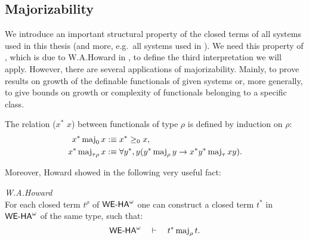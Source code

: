 %
\subsection{Majorizability}
%
%
We introduce an important structural property of the closed terms of all systems
used in this thesis (and more, e.g.\ all systems used in \cite{Kohlenbach08}). We need this
property of , which is due to W.A.Howard in \cite{Howard73}, 
to define the third interpretation we will apply. However, there are several applications
of majorizability. Mainly, to prove results on growth of the definable functionals of 
given systems or, more generally, to give 
bounds on growth or complexity of functionals belonging to a specific class.
\begin{dfn}
\label{d:maj}
The relation  ($x^*$  $x$) between functionals of
type $\rho$ is defined by induction on $\rho$:
\setcounter{equation}{0}
\begin{align}
 x^*\operatorname{maj}_0 x &:\equiv x^*\geq_0x\text{,} \\
 x^*\operatorname{maj}_{\tau\rho} x &:\equiv \forall y^*,y(y^*\operatorname{maj}_\rho y\rightarrow 
        x^*y^*\operatorname{maj}_\tau xy)\text{.}
\end{align}
\end{dfn}
%
Moreover, Howard showed in \cite{Howard73} the following very useful fact:
\begin{thm}{\em W.A.Howard \cite{Howard73}\\}
\/For each closed term $t^\rho$ of ${\textsf{\upshape WE-HA}}^{\omega}$ one can construct a closed term
$t^*$ in ${\textsf{\upshape WE-HA}}^{\omega}$ of the same type, such that:
\[
{\textsf{\upshape WE-HA}}^{\omega}\quad\vdash\quad t^* \operatorname{maj}_\rho t \text{.}
\]
\end{thm}

